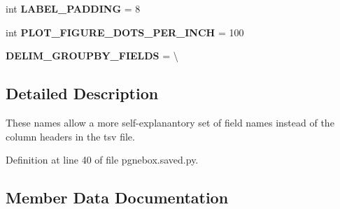 \begin{DoxyCompactItemize}
\item 
int {\bfseries L\+A\+B\+E\+L\+\_\+\+P\+A\+D\+D\+I\+NG} = 8\hypertarget{classnegui_1_1pgnebox_1_1PGNeEstimationBoxplotInterface_ad21e7bf7e3a072fb745bf421e9358bd7}{}\label{classnegui_1_1pgnebox_1_1PGNeEstimationBoxplotInterface_ad21e7bf7e3a072fb745bf421e9358bd7}

\item 
int {\bfseries P\+L\+O\+T\+\_\+\+F\+I\+G\+U\+R\+E\+\_\+\+D\+O\+T\+S\+\_\+\+P\+E\+R\+\_\+\+I\+N\+CH} = 100\hypertarget{classnegui_1_1pgnebox_1_1PGNeEstimationBoxplotInterface_a295c1bb135a2a7aea1103710302fc07e}{}\label{classnegui_1_1pgnebox_1_1PGNeEstimationBoxplotInterface_a295c1bb135a2a7aea1103710302fc07e}

\item 
{\bfseries D\+E\+L\+I\+M\+\_\+\+G\+R\+O\+U\+P\+B\+Y\+\_\+\+F\+I\+E\+L\+DS} = \textbackslash{}\hypertarget{classnegui_1_1pgnebox_1_1PGNeEstimationBoxplotInterface_afd50280ee86aa8a3e008c0c3d17811f9}{}\label{classnegui_1_1pgnebox_1_1PGNeEstimationBoxplotInterface_afd50280ee86aa8a3e008c0c3d17811f9}

\end{DoxyCompactItemize}


\subsection{Detailed Description}
\begin{DoxyVerb}These names allow a more self-explanantory set of field names
instead of the column headers in the tsv file.
\end{DoxyVerb}
 

Definition at line 40 of file pgnebox.\+saved.\+py.



\subsection{Member Data Documentation}

